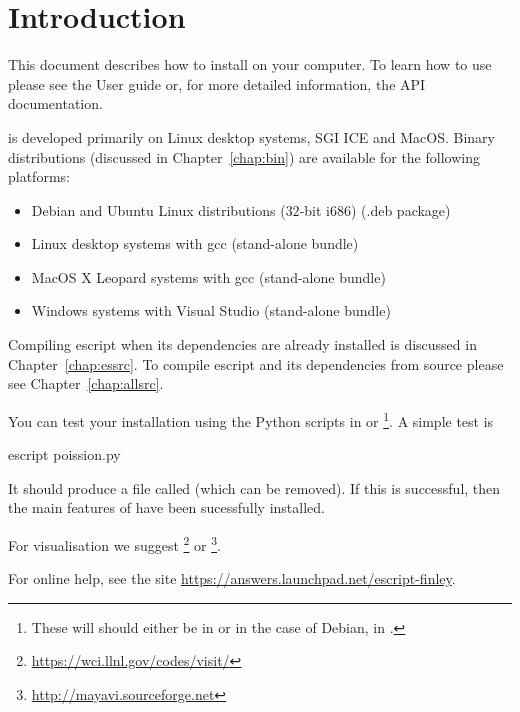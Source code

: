 

%
%
%

\chapter{Introduction}
This document describes how to install \esfinley on your computer.
To learn how to use \esfinley please see the User guide or, for
more detailed information, the API documentation.

\esfinley is developed primarily on Linux desktop systems,  SGI ICE and MacOS.
Binary distributions (discussed in Chapter~\ref{chap:bin}) are available for the following platforms:
\begin{itemize}
\item Debian and Ubuntu Linux distributions ($32$-bit i686) (.deb package)
\item Linux desktop systems with gcc (stand-alone bundle)
\item MacOS X Leopard systems with gcc (stand-alone bundle)
\item Windows systems with Visual Studio (stand-alone bundle) 
\end{itemize}

Compiling escript when its dependencies are already installed is discussed in Chapter~\ref{chap:essrc}.
To compile escript and its dependencies from source please see Chapter~\ref{chap:allsrc}.

You can test your installation using the Python scripts in  or 
\footnote{These will should either be in  or in the case of Debian, in .}.
A simple test is
\begin{shellCode}
 escript poission.py
\end{shellCode}
It should produce a file called  (which can be removed).
If this is successful, then the main features of \escript have been sucessfully installed.

For visualisation we suggest \footnote{\url{https://wci.llnl.gov/codes/visit/}} or \footnote{\url{http://mayavi.sourceforge.net}}.

For online help, see the site \url{https://answers.launchpad.net/escript-finley}.
